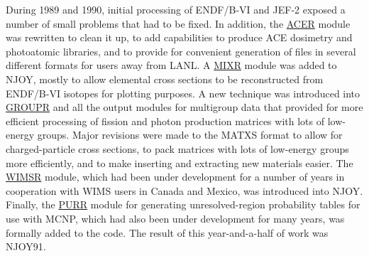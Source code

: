 During 1989 and 1990, initial processing of ENDF/B-VI and JEF-2
exposed a number of small problems that had to be fixed.  In
addition, the \hyperlink{sACERhy}{ACER} module
was rewritten to clean it up,
to add capabilities to produce ACE dosimetry
and photoatomic libraries, and
to provide for convenient generation of files in several
different formats for users away from LANL.  A
\hyperlink{sMIXRhy}{MIXR} module was added
to NJOY, mostly to allow elemental cross sections to be reconstructed
from ENDF/B-VI isotopes for plotting purposes.  A new technique
was introduced into \hyperlink{sGROUPRhy}{GROUPR}
and all the output modules for
multigroup data that provided for more efficient
processing of fission and photon production matrices with lots of
low-energy groups.  Major revisions were made to the
MATXS format to allow for charged-particle
cross sections,
to pack matrices with lots of low-energy groups more efficiently,
and to make inserting and extracting new materials easier.  The
\hyperlink{sWIMSRhy}{WIMSR} module, which
had been under development for
a number of years in cooperation with WIMS users
in Canada and Mexico, was introduced into NJOY.  Finally, the
\hyperlink{sPURRhy}{PURR} module for generating
unresolved-region  probability
tables for use with MCNP,
which had also been under development
for many years, was formally added to the code.  The result of
this year-and-a-half of work was NJOY91.

